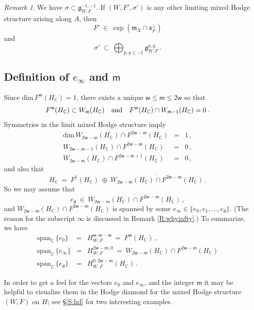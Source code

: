 \documentclass[12pt]{amsart}
\numberwithin{equation}{section}
\numberwithin{table}{section}
\def\s{\sigma}
\def\bC{\mathbb{C}}
\def\tdim{\mathrm{dim}}
\def\fg{\mathfrak{g}}
\def\fm{\mathfrak{m}}
\def\sfm{\mathsf{m}}
\def\tspan{\mathrm{span}}
\def\sfw{\mathsf{w}}
\def\tand{\quad\hbox{and}\quad}
\def\op{\oplus}
\theoremstyle{definition}
\theoremstyle{definition}
\theoremstyle{remark}
\newtheorem{remark}[equation]{Remark}
\def\sfd{\mathsf{d}}
\def\fs{\mathfrak{s}}
\begin{document}
\begin{remark} \label{R:anotherchoice}
We have $\s \subset \fg^{-1,-1}_{W,F}$.  If $(W,F',\s')$ is any other limiting mixed Hodge structure arising along $A$, then 
\[
  F' \ \in \  \exp( \fm_X \cap \fs_F^\perp)
\]
and 
\[
  \s' \ \subset \ \bigoplus_{p,q\le-1} \fg^{p,q}_{W,F} \,.
\]
\end{remark}

\subsection{Definition of $e_\infty$ and $\sfm$} \label{S:einfty}

Since $\tdim\,F^\sfw(H_\bC) = 1$, there exists a unique $\sfw\le\sfm\le2\sfw$ so that
\[
  F^\sfw(H_\bC) \subset W_\sfm(H_\bC) 
  \tand 
  F^\sfw(H_\bC) \cap W_{\sfm-1}(H_\bC) = 0 \,.
\]
Symmetries in the limit mixed Hodge structure imply 
\begin{eqnarray*}
  \tdim\,W_{2\sfw-\sfm}(H_\bC) \cap F^{2\sfw-\sfm}(H_\bC) & = & 1\,,\\
  W_{2\sfw-\sfm-1}(H_\bC) \cap F^{2\sfw-\sfm}(H_\bC) & = & 0 \,,\\
  W_{2\sfw-\sfm}(H_\bC) \cap F^{2\sfw-\sfm+1}(H_\bC) & = & 0\,,
\end{eqnarray*}
and also that 
\[
  H_\bC \ = \ F^1(H_\bC) \ \op \ 
  \overline{W_{2\sfw-\sfm}(H_\bC) \cap F^{2\sfw-\sfm}(H_\bC)} \,.
\]
So we may assume that
\[
  e_\sfd \ \in \ 
  \overline{W_{2\sfw-\sfm}(H_\bC) \cap F^{2\sfw-\sfm}(H_\bC)} \,,
\] 
and $W_{2\sfw-\sfm}(H_\bC) \cap F^{2\sfw-\sfm}(H_\bC)$ is spanned by some $e_\infty \in \{e_0,e_1,\ldots,e_\sfd\}$.  (The reason for the subscript $\infty$ is discussed in Remark \ref{R:whyinfty}.)  To summarize, we have
\begin{eqnarray}
  \nonumber
  \tspan_\bC\,\{e_0\} & = & H^{\sfw,\sfm-\sfw}_{W,F} 
  \ = \ F^\sfw(H_\bC) \,,\\
  \label{E:H}
  \tspan_\bC\,\{e_\infty\} & = & H^{2\sfw-\sfm,0}_{W,F} 
  \ = \ W_{2\sfw-\sfm}(H_\bC) \cap F^{2\sfw-\sfm}(H_\bC)  \\
  \nonumber
  \tspan_\bC\,\{e_\sfd\} & = & H^{0,2\sfw-\sfm}_{W,F}(H_\bC)\,.
\end{eqnarray}

In order to get a feel for the vectors $e_0$ and $e_\infty$, and  the integer $\sfm$ it may be helpful to visualize them in the Hodge diamond for the mixed Hodge structure $(W,F)$ on $H$; see  \S\ref{S:hd} for two interesting examples.
\end{document}
